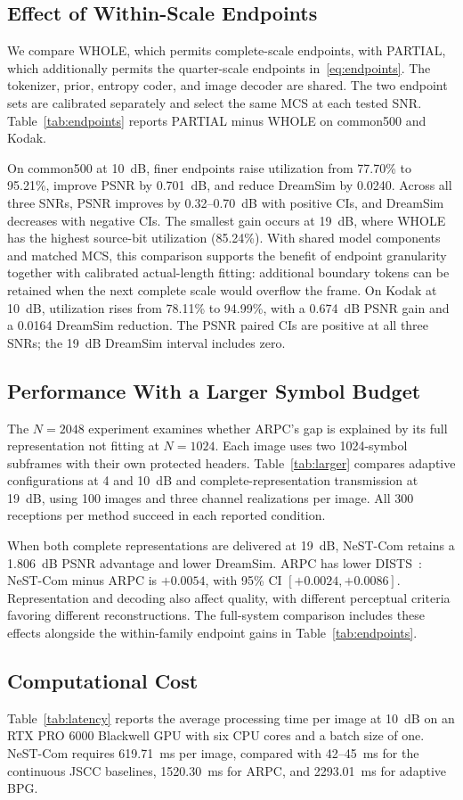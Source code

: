 \subsection{Effect of Within-Scale Endpoints}
We compare WHOLE, which permits complete-scale endpoints, with PARTIAL, which additionally permits the quarter-scale endpoints in~\eqref{eq:endpoints}. The tokenizer, prior, entropy coder, and image decoder are shared. The two endpoint sets are calibrated separately and select the same MCS at each tested SNR. Table~\ref{tab:endpoints} reports PARTIAL minus WHOLE on common500 and Kodak.

On common500 at 10~dB, finer endpoints raise utilization from 77.70\% to 95.21\%, improve PSNR by 0.701~dB, and reduce DreamSim by 0.0240. Across all three SNRs, PSNR improves by 0.32--0.70~dB with positive CIs, and DreamSim decreases with negative CIs. The smallest gain occurs at 19~dB, where WHOLE has the highest source-bit utilization (85.24\%). With shared model components and matched MCS, this comparison supports the benefit of endpoint granularity together with calibrated actual-length fitting: additional boundary tokens can be retained when the next complete scale would overflow the frame.
On Kodak at 10~dB, utilization rises from 78.11\% to 94.99\%, with a 0.674~dB PSNR gain and a 0.0164 DreamSim reduction. The PSNR paired CIs are positive at all three SNRs; the 19~dB DreamSim interval includes zero.


\subsection{Performance With a Larger Symbol Budget}
The $N=2048$ experiment examines whether ARPC's gap is explained by its full representation not fitting at $N=1024$. Each image uses two 1024-symbol subframes with their own protected headers. Table~\ref{tab:larger} compares adaptive configurations at 4 and 10~dB and complete-representation transmission at 19~dB, using 100 images and three channel realizations per image. All 300 receptions per method succeed in each reported condition.

When both complete representations are delivered at 19~dB, NeST-Com retains a 1.806~dB PSNR advantage and lower DreamSim. ARPC has lower DISTS~\cite{dists}: NeST-Com minus ARPC is $+0.0054$, with 95\% CI $[+0.0024,+0.0086]$. Representation and decoding also affect quality, with different perceptual criteria favoring different reconstructions. The full-system comparison includes these effects alongside the within-family endpoint gains in Table~\ref{tab:endpoints}.


\subsection{Computational Cost}
Table~\ref{tab:latency} reports the average processing time per image at 10~dB on an RTX PRO 6000 Blackwell GPU with six CPU cores and a batch size of one. NeST-Com requires 619.71~ms per image, compared with 42--45~ms for the continuous JSCC baselines, 1520.30~ms for ARPC, and 2293.01~ms for adaptive BPG.

